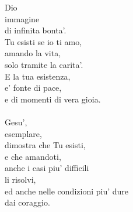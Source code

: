 \begin{haiku}
Dio\\
immagine\\
di infinita bonta'.\\
Tu esisti se io ti amo,\\
amando la vita,\\
solo tramite la carita'.\\
E la tua esistenza,\\
e' fonte di pace,\\
e di momenti di vera gioia.\\
\leavevmode\\
Gesu',\\
esemplare,\\
dimostra che Tu esisti,\\
e che amandoti,\\
anche i casi piu' difficili\\
li risolvi,\\
ed anche nelle condizioni piu' dure\\
dai coraggio.\\
\end{haiku}
